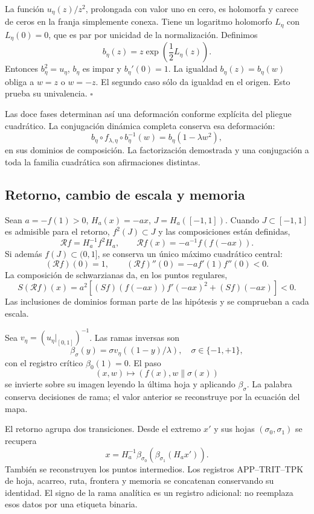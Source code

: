 La función \(u_\eta(z)/z^2\), prolongada con valor uno en cero, es holomorfa y carece de ceros en la franja simplemente conexa. Tiene un logaritmo holomorfo \(L_\eta\) con \(L_\eta(0)=0\), que es par por unicidad de la normalización. Definimos
\[
b_\eta(z)=z\exp\!\left(\frac12L_\eta(z)\right).
\]
Entonces \(b_\eta^2=u_\eta\), \(b_\eta\) es impar y \(b_\eta'(0)=1\). La igualdad \(b_\eta(z)=b_\eta(w)\) obliga a \(w=z\) o \(w=-z\). El segundo caso sólo da igualdad en el origen. Esto prueba su univalencia. \(\square\)

Las doce fases determinan así una deformación conforme explícita del pliegue cuadrático. La conjugación dinámica completa conserva esa deformación:
\[
b_\eta\circ f_{\lambda,\eta}\circ b_\eta^{-1}(w)
=b_\eta(1-\lambda w^2),
\]
en sus dominios de composición. La factorización demostrada y una conjugación a toda la familia cuadrática son afirmaciones distintas.


\subsection{Retorno, cambio de escala y memoria}
\label{hmtfg:desarrollo:5}

Sean \(a=-f(1)>0\), \(H_a(x)=-ax\), \(J=H_a([-1,1])\). Cuando \(J\subset[-1,1]\) es admisible para el retorno, \(f^2(J)\subset J\) y las composiciones están definidas,
\[
\mathcal Rf=H_a^{-1}f^2H_a,\qquad
\mathcal Rf(x)=-a^{-1}f(f(-ax)).
\]
Si además \(f(J)\subset(0,1]\), se conserva un único máximo cuadrático central:
\[
(\mathcal Rf)(0)=1,\qquad
(\mathcal Rf)''(0)=-a f'(1)f''(0)<0.
\]
La composición de schwarzianas da, en los puntos regulares,
\[
S(\mathcal Rf)(x)=a^2
\left[(Sf)(f(-ax))f'(-ax)^2+(Sf)(-ax)\right]<0.
\]
Las inclusiones de dominios forman parte de las hipótesis y se comprueban a cada escala.

Sea \(v_\eta=(u_\eta|_{[0,1]})^{-1}\). Las ramas inversas son
\[
\beta_\sigma(y)=\sigma v_\eta((1-y)/\lambda),\quad
\sigma\in\{-1,+1\},
\]
con el registro crítico \(\beta_0(1)=0\). El paso
\[
(x,w)\longmapsto(f(x),w\mathbin{\|}\sigma(x))
\]
se invierte sobre su imagen leyendo la última hoja y aplicando \(\beta_\sigma\). La palabra conserva decisiones de rama; el valor anterior se reconstruye por la ecuación del mapa.

El retorno agrupa dos transiciones. Desde el extremo \(x'\) y sus hojas \((\sigma_0,\sigma_1)\) se recupera
\[
x=H_a^{-1}\beta_{\sigma_0}
\!\left(\beta_{\sigma_1}(H_ax')\right).
\]
También se reconstruyen los puntos intermedios. Los registros APP–TRIT–TPK de hoja, acarreo, ruta, frontera y memoria se concatenan conservando su identidad. El signo de la rama analítica es un registro adicional: no reemplaza esos datos por una etiqueta binaria.

